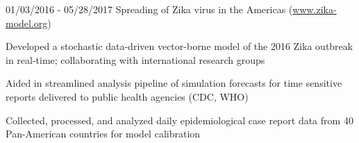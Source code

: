 \begin{cventries}
\begin{cventries}
  \cventryfour
    {} %
    {} %
    {} %
    {01/03/2016 - 05/28/2017} %
    {Spreading of Zika virus in the Americas	(\href{www.zika-model.org}{www.zika-model.org})}
    {
      \begin{cvitems} %
      	\item {Developed a stochastic data-driven vector-borne model of the 2016 Zika outbreak in real-time; 
        collaborating with 
        international
        research groups}
        \item {Aided in streamlined analysis pipeline of 
        simulation forecasts
        for time sensitive reports delivered to public health agencies (CDC, WHO)}
        \item {Collected, processed, and analyzed daily epidemiological case report data from 40 Pan-American countries for model calibration}
      \end{cvitems}
    }


\end{cventries}
\end{cventries}
